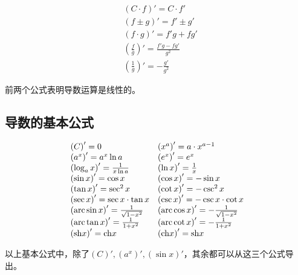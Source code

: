 \begin{align*}
&\left( C\cdot f \right) '=C\cdot f' \\
&\left( f\pm g \right) '=f'\pm g' \\
&\left( f\cdot g \right) '=f'g+fg' \\
&\left( \frac{f}{g} \right) '=\frac{f'g-fg'}{g^2} \\
&\left( \frac{1}{g} \right) '=-\frac{g'}{g^2}
\end{align*}

前两个公式表明导数运算是线性的。

\subsection{导数的基本公式}

\begin{align*}
\begin{matrix}
	\left( C \right) '=0 \hfill                                       & \left( x^a \right) '=a\cdot x^{a-1} \hfill \\
	\left( a^x \right) '=a^x\ln a \hfill                              & \left( e^x \right) '=e^x \hfill \\
	\left( \log _ax \right) '=\frac{1}{x\ln a} \hfill                 & \left( \ln x \right) '=\frac{1}{x} \hfill \\
	\left( \sin x \right) '=\cos x \hfill                             & \left( \cos x \right) '=-\sin x \hfill \\
	\left( \tan x \right) '=\sec ^2x \hfill                           & \left( \cot x \right) '=-\csc ^2x \hfill \\
	\left( \sec x \right) '=\sec x\cdot \tan x \hfill                 & \left( \csc x \right) '=-\csc x\cdot \cot x \hfill \\
	\left( \mathrm{arc}\sin x \right) '=\frac{1}{\sqrt{1-x^2}} \hfill & \left( \mathrm{arc}\cos x \right) '=-\frac{1}{\sqrt{1-x^2}} \hfill \\
	\left( \mathrm{arc}\tan x \right) '=\frac{1}{1+x^2} \hfill        & \left( \mathrm{arc}\cot x \right) '=-\frac{1}{1+x^2} \hfill \\
	\left( \mathrm{sh}x \right) '=\mathrm{ch}x \hfill                 & \left( \mathrm{ch}x \right) '=\mathrm{sh}x \hfill \\
\end{matrix}
\end{align*}

以上基本公式中，除了$\left( C \right) ',\left( a^x \right) ',\left( \sin x \right) '$，其余都可以从这三个公式导出。

